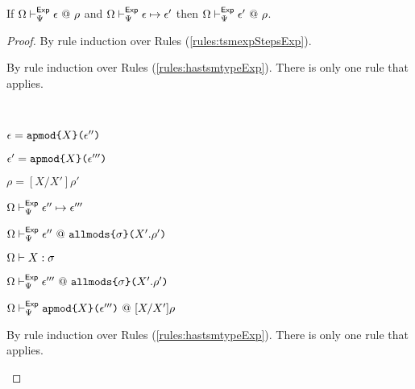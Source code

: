 \begin{theorem}
\label{thm:peTSM-preservation}
If $\Omega \vdash_{\Psi}^{\mathsf{Exp}} \epsilon ~@~ \rho$ and $\Omega \vdash_{\Psi}^\mathsf{Exp} \epsilon \mapsto \epsilon'$ then $\Omega \vdash_{\Psi}^{\mathsf{Exp}} \epsilon' ~@~ \rho$.
\end{theorem}
\begin{proof}
By rule induction over Rules (\ref{rules:tsmexpStepsExp}).

\begin{byCases}
\item[\text{(\ref{rule:tsmexpStepsExp-apmod-1})}] By rule induction over Rules (\ref{rules:hastsmtypeExp}). There is only one rule that applies.
  \begin{byCases}
  \item[\text{(\ref{rule:hastsmtypeExp-apmod})}] ~
    \begin{pfsteps*}
      \item $\epsilon=\texttt{apmod}\texttt{\{}X\texttt{\}(}\epsilon''\texttt{)}$ 
      \item $\epsilon'=\texttt{apmod}\texttt{\{}X\texttt{\}(}\epsilon'''\texttt{)}$ 
      \item $\rho=[X/X']\rho'$ 
      \item $\Omega \vdash_{\Psi}^\mathsf{Exp} \epsilon'' \mapsto \epsilon'''$  
      \item $\Omega \vdash_{\Psi}^{\mathsf{Exp}} \epsilon'' ~@~ \texttt{allmods}\texttt{\{}\sigma\texttt{\}(}X'.\rho'\texttt{)}$  
      \item $\Omega \vdash X : \sigma$  
      \item $\Omega \vdash_{\Psi}^{\mathsf{Exp}} \epsilon''' ~@~ \texttt{allmods}\texttt{\{}\sigma\texttt{\}(}X'.\rho'\texttt{)}$ 
      \item $\Omega \vdash_{\Psi}^{\mathsf{Exp}} \texttt{apmod}\texttt{\{}X\texttt{\}(}\epsilon'''\texttt{)} ~@~ [X/X']\rho$ 
    \end{pfsteps*}
    \resetpfcounter
  \end{byCases}
\item[\text{(\ref{rule:tsmexpStepsExp-apmod-2})}] By rule induction over Rules (\ref{rules:hastsmtypeExp}). There is only one rule that applies.

\end{byCases}
\end{proof}
